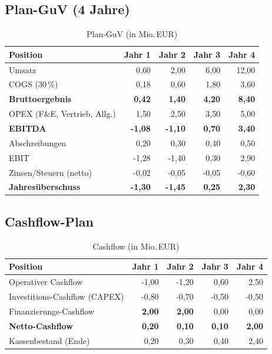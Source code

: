 \documentclass[
%
ngerman %
%
numeric %
]{wbh-assignment}
\begin{document}
\vspace*{5mm}

\subsection{Plan-GuV (4 Jahre)}
\begin{table}[htb!]
\centering
\caption{Plan-GuV (in Mio.\,EUR)}
\begin{tabular}{l r r r r}
\textbf{Position} & \textbf{Jahr 1} & \textbf{Jahr 2} & \textbf{Jahr 3} & \textbf{Jahr 4} \\
\hline
Umsatz & 0{,}60 & 2{,}00 & 6{,}00 & 12{,}00 \\
COGS (30\,\%) & 0{,}18 & 0{,}60 & 1{,}80 & 3{,}60 \\
\textbf{Bruttoergebnis} & \textbf{0{,}42} & \textbf{1{,}40} & \textbf{4{,}20} & \textbf{8{,}40} \\
OPEX (F\&E, Vertrieb, Allg.) & 1{,}50 & 2{,}50 & 3{,}50 & 5{,}00 \\
\textbf{EBITDA} & \textbf{-1{,}08} & \textbf{-1{,}10} & \textbf{0{,}70} & \textbf{3{,}40} \\
Abschreibungen & 0{,}20 & 0{,}30 & 0{,}40 & 0{,}50 \\
EBIT & -1{,}28 & -1{,}40 & 0{,}30 & 2{,}90 \\
Zinsen/Steuern (netto) & -0{,}02 & -0{,}05 & -0{,}05 & -0{,}60 \\
\textbf{Jahresüberschuss} & \textbf{-1{,}30} & \textbf{-1{,}45} & \textbf{0{,}25} & \textbf{2{,}30} \\
\end{tabular}
\end{table}

\subsection{Cashflow-Plan}
\begin{table}[htb!]
\centering
\caption{Cashflow (in Mio.\,EUR)}
\begin{tabular}{l r r r r}
\textbf{Position} & \textbf{Jahr 1} & \textbf{Jahr 2} & \textbf{Jahr 3} & \textbf{Jahr 4} \\
\hline
Operativer Cashflow & -1{,}00 & -1{,}20 & 0{,}60 & 2{,}50 \\
Investitions-Cashflow (CAPEX) & -0{,}80 & -0{,}70 & -0{,}50 & -0{,}50 \\
Finanzierungs-Cashflow & \textbf{2{,}00} & \textbf{2{,}00} & 0{,}00 & 0{,}00 \\
\textbf{Netto-Cashflow} & \textbf{0{,}20} & \textbf{0{,}10} & \textbf{0{,}10} & \textbf{2{,}00} \\
Kassenbestand (Ende) & 0{,}20 & 0{,}30 & 0{,}40 & 2{,}40 \\
\end{tabular}
\end{table}
\end{document}

